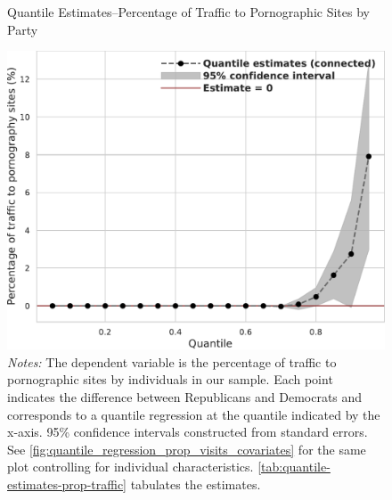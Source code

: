 \documentclass[12pt, letterpaper]{article}
\begin{document}
\begin{figure}
	\centering
	\caption{Quantile Estimates--Percentage of Traffic to Pornographic Sites by Party}
	\includegraphics[width=.55\linewidth]{figs/quantile_reg_proportion_visits_adult.pdf}
	\caption*{\footnotesize \emph{Notes:} 
		The dependent variable is the percentage of traffic to pornographic sites by individuals in our sample.
		Each point indicates the difference between Republicans and Democrats and corresponds to a quantile regression at the quantile indicated by the x-axis.
		95\% confidence intervals constructed from standard errors.
		See \cref{fig:quantile_regression_prop_visits_covariates} for the same plot controlling for individual characteristics.
            \cref{tab:quantile-estimates-prop-traffic} tabulates the estimates.
	}
	\label{fig:quantile_regression_prop_visits}
\end{figure}
\end{document}
